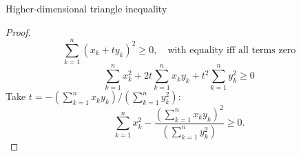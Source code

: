 \documentclass{beamer}
\begin{document}
\begin{frame}{Higher-dimensional triangle inequality}
\begin{proof}
$$\sum_{k=1}^n (x_k + ty_k)^2\geq 0,\quad \text{with equality iff all terms zero}$$
$$\sum_{k=1}^n x_k^2 + 2t\sum_{k=1}^n x_ky_k + t^2\sum_{k=1}^ny_k^2\geq 0$$
Take $t = -\left(\sum_{k=1}^n x_ky_k\right)/\left(\sum_{k=1}^ny_k^2\right):$
$$\sum_{k=1}^n x_k^2 -\frac{ \left(\sum_{k=1}^n x_ky_k\right)^2}{\left(\sum_{k=1}^ny_k^2\right)}\geq 0.$$
\end{proof}
\end{frame}
\end{document}

